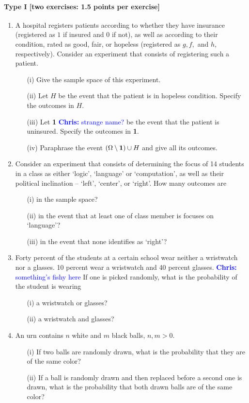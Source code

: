 \documentclass{article}
\newcommand{\chris}[1]{ \textcolor{blue}{\textbf{Chris:} #1}}
\begin{document}
\paragraph{Type I [two exercises: 1.5 points per exercise]}
\begin{enumerate}
\item A hospital registers patients according to whether they have insurance (registered as $1$ if insured and $0$ if not), as well as according to their condition, rated as good, fair, or hopeless (registered as $g, f,$ and  $h$, respectively). Consider an experiment that consists of registering such a patient. \begin{itemize}
		\item[(i)] Give the sample space of this experiment.
		\item[(ii)] Let $H$ be the event that the patient is in hopeless condition. Specify the outcomes in $H$.
		\item[(iii)] Let {\bf 1}\chris{strange name?} be the event that the patient is uninsured. Specify the outcomes in {\bf 1}.
		\item[(iv)] Paraphrase the event $(\Omega \setminus {{\bf 1}}) \cup H$ and give all its outcomes.
		\end{itemize}
	\item Consider an experiment that consists of determining the focus of 14 students in a class as either `logic', `language' or `computation', as well as their political inclination -- `left', `center', or `right'. How many outcomes are
\begin{itemize}
	\item[(i)] in the sample space?
	\item[(ii)] in the event that at least one of class member is focuses on `language'?
	\item[(iii)] in the event that none identifies as `right'?
\end{itemize}
\item Forty percent of the students at a certain school wear neither a wristwatch nor a glasses. 10 percent wear a wristwatch and 40 percent glasses.\chris{something's fishy here} If one is picked randomly, what is the probability of the student is wearing
	\begin{itemize}
		\item[(i)] a wristwatch or glasses?
		\item[(ii)] a wristwatch and glasses?
	\end{itemize}
\item An urn contains $n$ white and $m$ black balls, $n, m > 0$.
	\begin{itemize}
		\item[(i)] If two balls are randomly drawn, what is the probability that they are of the same color?
		\item[(ii)] If a ball is randomly drawn and then replaced before a second one is drawn, what is the probability that both drawn balls are of the same color?
	\end{itemize}
\end{enumerate}
\end{document}
